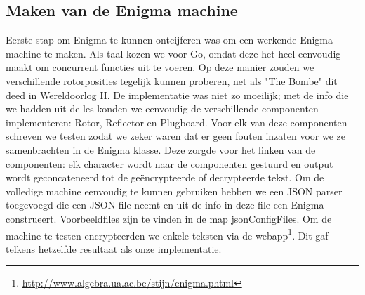 \subsection{Maken van de Enigma machine}
Eerste stap om Enigma te kunnen ontcijferen was om een werkende Enigma machine te maken. Als taal kozen we voor Go, omdat deze het heel eenvoudig maakt om concurrent functies uit te voeren. Op deze manier zouden we verschillende rotorposities tegelijk kunnen proberen, net als "The Bombe" dit deed in Wereldoorlog II. De implementatie was niet zo moeilijk; met de info die we hadden uit de les konden we eenvoudig de verschillende componenten implementeren: Rotor, Reflector en Plugboard. Voor elk van deze componenten schreven we testen zodat we zeker waren dat er geen fouten inzaten voor we ze samenbrachten in de Enigma klasse. Deze zorgde voor het linken van de componenten: elk character wordt naar de componenten gestuurd en output wordt geconcateneerd tot de ge\"encrypteerde of decrypteerde tekst. Om de volledige machine eenvoudig te kunnen gebruiken hebben we een JSON parser toegevoegd die een JSON file neemt en uit de info in deze file een Enigma construeert. Voorbeeldfiles zijn te vinden in de map jsonConfigFiles. Om de machine te testen encrypteerden we enkele teksten via de webapp\footnote{\url{http://www.algebra.ua.ac.be/stijn/enigma.phtml}}. Dit gaf telkens hetzelfde resultaat als onze implementatie.

